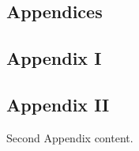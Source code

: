 \begin{appendices}

{}
\part*{Appendices}

\chapter{Appendix I}

% 
    
\chapter{Appendix II}

Second Appendix content.

\end{appendices}